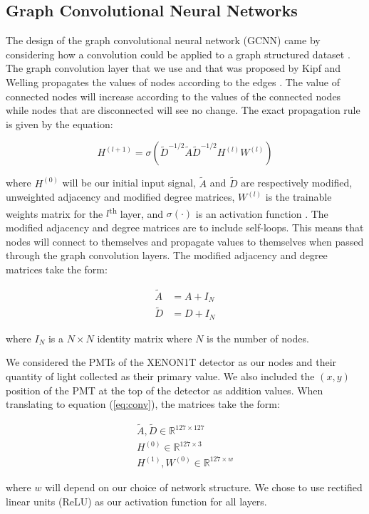\documentclass[thesis.tex]{subfiles}
\begin{document}
\subsection{Graph Convolutional Neural Networks}
The design of the graph convolutional neural network (GCNN) came by considering how a convolution could be applied to a graph structured dataset \cite{GCNN_Kipf}.
The graph convolution layer that we use and that was proposed by Kipf and Welling propagates the values of nodes according to the edges \cite{GCNN_Kipf}.
The value of connected nodes will increase according to the values of the connected nodes while nodes that are disconnected will see no change.
The exact propagation rule is given by the equation:
\begin{linenomath}\begin{equation}\label{eq:conv}
H^{(l+1)} = \sigma\left( \tilde{D}^{-1/2} \tilde{A} \tilde{D}^{-1/2} H^{(l)} W^{(l)} \right)
\end{equation}\end{linenomath}
where $H^{(0)}$ will be our initial input signal, $\tilde{A}$ and $\tilde{D}$ are respectively modified, unweighted adjacency and modified degree matrices, $W^{(l)}$ is the trainable weights matrix for the $l$\textsuperscript{th} layer, and $\sigma(\cdot)$ is an activation function \cite{GCNN_Kipf}.
The modified adjacency and degree matrices are to include self-loops.
This means that nodes will connect to themselves and propagate values to themselves when passed through the graph convolution layers.
The modified adjacency and degree matrices take the form:
\begin{linenomath}\begin{align*}
	\tilde{A} &= A + I_{N} \\
	\tilde{D} &= D + I_{N}
\end{align*}\end{linenomath}
where $I_{N}$ is a $N \times N$ identity matrix where $N$ is the number of nodes.

\par We considered the PMTs of the XENON1T detector as our nodes and their quantity of light collected as their primary value.
We also included the $(x,y)$ position of the PMT at the top of the detector as addition values.
When translating to equation (\ref{eq:conv}), the matrices take the form:
\begin{linenomath}\begin{align*}
	\tilde{A}, \tilde{D} \in \mathbb{R}^{127 \times 127} \\
	H^{(0)} \in \mathbb{R}^{127 \times 3} \\
	H^{(1)}, W^{(0)} \in \mathbb{R}^{127 \times w}
\end{align*}\end{linenomath}
where $w$ will depend on our choice of network structure.
We chose to use rectified linear units (ReLU) as our activation function for all layers.
\end{document}

